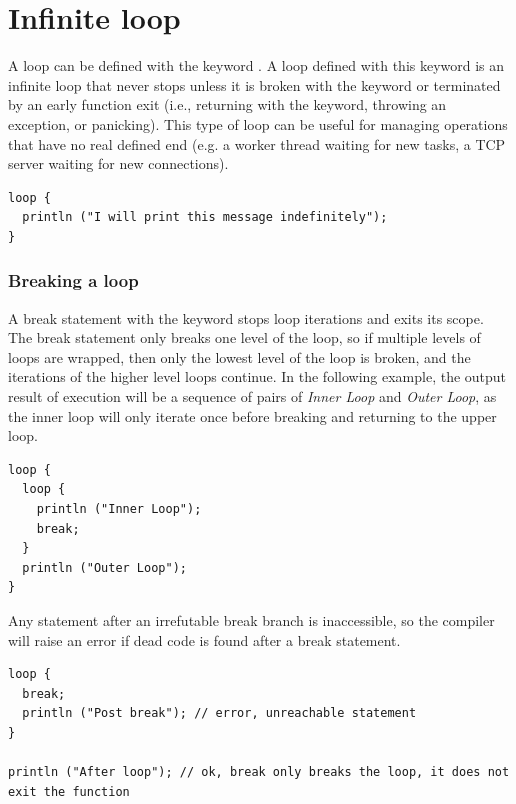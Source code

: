 \section{Infinite loop}%
\label{sec:inf_loop}

A loop can be defined with the keyword . A loop defined with this
keyword is an infinite loop that never stops unless it is broken with the
 keyword or terminated by an early function exit (i.e., returning
with the  keyword, throwing an exception, or panicking). This type
of loop can be useful for managing operations that have no real defined end
(e.g. a worker thread waiting for new tasks, a TCP server waiting for new
connections).

\begin{lstlisting}[style=coloredverbatim, escapechar=@]
loop {
  println ("I will print this message indefinitely");
}
\end{lstlisting}

\subsubsection{Breaking a loop}
\label{sec:breaking_loops}

A break statement with the keyword  stops loop iterations and exits
its scope. The break statement only breaks one level of the loop, so if multiple
levels of loops are wrapped, then only the lowest level of the loop is broken,
and the iterations of the higher level loops continue. In the following example,
the output result of execution will be a sequence of pairs of \textit{Inner
  Loop} and \textit{Outer Loop}, as the inner loop will only iterate once before
breaking and returning to the upper loop.

\begin{lstlisting}[style=coloredverbatim, escapechar=@]
loop {
  loop {
    println ("Inner Loop");
    break;
  }
  println ("Outer Loop");
}
\end{lstlisting}

Any statement after an irrefutable break branch is inaccessible, so the compiler
will raise an error if dead code is found after a break statement.

\begin{lstlisting}[style=coloredverbatim, escapechar=@]
loop {
  break;
  println ("Post break"); // error, unreachable statement
}

println ("After loop"); // ok, break only breaks the loop, it does not exit the function
\end{lstlisting}

